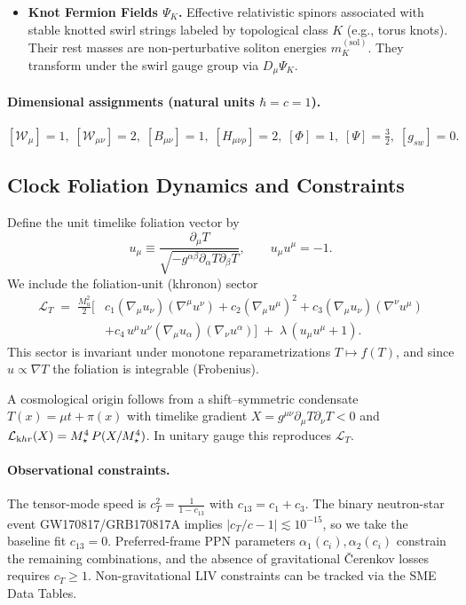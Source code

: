 \documentclass[smallextended]{svjour3}       %
\begin{document}
\begin{itemize}
		\item \textbf{Knot Fermion Fields \(\Psi_K\).}
		Effective relativistic spinors associated with stable knotted swirl strings labeled by topological class \(K\) (e.g., torus knots). Their rest masses are non-perturbative soliton energies \(m_K^{(\mathrm{sol})}\). They transform under the swirl gauge group via \(D_\mu\Psi_K\).

	\end{itemize}

	\paragraph{Dimensional assignments (natural units \(\hbar=c=1\)).}
	\([ \mathcal{W}_\mu ]=1,\; [ \mathcal{W}_{\mu\nu} ]=2,\; [ B_{\mu\nu} ]=1,\; [ H_{\mu\nu\rho} ]=2,\; [ \Phi ]=1,\; [ \Psi ]=\tfrac{3}{2},\; [g_{\!sw}]=0.\)

	\subsection{Clock Foliation Dynamics and Constraints}
	Define the unit timelike foliation vector by
	\begin{equation}
		u_\mu \equiv \frac{\partial_\mu T}{\sqrt{-g^{\alpha\beta}\partial_\alpha T\partial_\beta T}},\qquad u_\mu u^\mu=-1.
	\end{equation}
	We include the foliation-unit (khronon) sector
	\begin{align}
		\mathcal L_{T} \;=\; \frac{M_u^{2}}{2}\Big[&c_1(\nabla_\mu u_\nu)(\nabla^\mu u^\nu)+c_2(\nabla_\mu u^\mu)^2+c_3(\nabla_\mu u_\nu)(\nabla^\nu u^\mu)\\
		&+c_4\,u^\mu u^\nu (\nabla_\mu u_\alpha)(\nabla_\nu u^\alpha)\Big]
		\;+\;\lambda\,(u_\mu u^\mu+1).\nonumber
	\end{align}
	This sector is invariant under monotone reparametrizations \(T\mapsto f(T)\), and since \(u\propto\nabla T\) the foliation is integrable (Frobenius).

	A cosmological origin follows from a shift--symmetric condensate \(T(x)=\mu t+\pi(x)\) with timelike gradient \(X=g^{\mu\nu}\partial_\mu T\partial_\nu T<0\) and
	\(\mathcal L_{\textrm khr}(X)=M_\star^4\,P(X/M_\star^4)\). In unitary gauge this reproduces \(\mathcal L_T\).

	\paragraph{Observational constraints.}
	The tensor-mode speed is
	\(c_T^2=\frac{1}{1-c_{13}}\) with \(c_{13}=c_1+c_3\). The binary neutron-star event GW170817/GRB170817A implies \(|c_T/c-1|\lesssim10^{-15}\), so we take the baseline fit \(c_{13}=0\).
	Preferred-frame PPN parameters \(\alpha_1(c_i),\alpha_2(c_i)\) constrain the remaining combinations, and the absence of gravitational \v{C}erenkov losses requires \(c_T\ge 1\).
	Non-gravitational LIV constraints can be tracked via the SME Data Tables.
\end{document}
